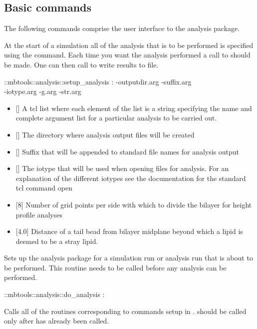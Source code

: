 \subsection{Basic commands}
The following commands comprise the user interface to the analysis package.

At the start of a simulation all of the analysis that is to be
performed is specified using the 
command. Each time you want the analysis performed a call to
 should be made. One can then call
 to write results to file.

\begin{code} 
  ::mbtools::analysis::setup_analysis : -outputdir.arg -suffix.arg \\
  -iotype.arg -g.arg -str.arg
\end{code}
\begin{itemize}
\item {} [] A tcl list where each element of
  the list is a string specifying the name and complete argument list
  for a particular analysis to be carried out.
\item {} [] The directory where analysis
  output files will be created
\item {} [] Suffix that will be appended to
  standard file names for analysis output
\item {} [] The iotype that will be used when opening
  files for analysis. For an explanation of the different iotypes see
  the documentation for the standard tcl command open
\item {} [8] Number of grid points per side with which to divide
  the bilayer for height profile analyses
\item {} [4.0] Distance of a tail bead from bilayer midplane
  beyond which a lipid is deemed to be a stray lipid.
\end{itemize}

Sets up the analysis package for a simulation run or analysis run that
is about to be performed. This routine needs to be called before any
analysis can be performed.

\begin{code}
 ::mbtools::analysis::do_analysis :
\end{code}
Calls all of the  routines corresponding to commands
setup in .  should be
called only after  has already been called.

